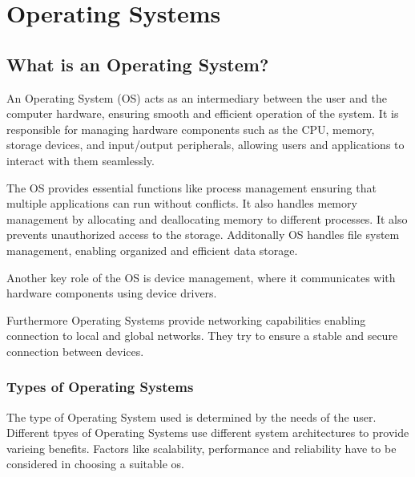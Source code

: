 \chapter{Operating Systems}
\label{chap:Operating_Systems_used}




\section{What is an Operating System?}

An Operating System (OS) acts as an intermediary between the user and the computer hardware, ensuring smooth and efficient operation of the system. It is responsible for managing hardware components such as the CPU, memory, storage devices, and input/output peripherals, allowing users and applications to interact with them seamlessly.

The OS provides essential functions like process management ensuring that multiple applications can run without conflicts. It also handles memory management by allocating and deallocating memory to different processes. It also prevents unauthorized access to the storage.
Additonally OS handles file system management, enabling organized and efficient data storage. 

Another key role of the OS is device management, where it communicates with hardware components using device drivers.

Furthermore Operating Systems provide networking capabilities enabling connection to local and global networks. They try to ensure a stable and secure connection between devices.


\cite{WhatIsAnOs}

\subsection {Types of Operating Systems}

The type of Operating System used is determined by the needs of the user. 
Different tpyes of Operating Systems use different system architectures to provide varieing benefits.
Factors like scalability, performance and reliability have to be considered in choosing a suitable os.


